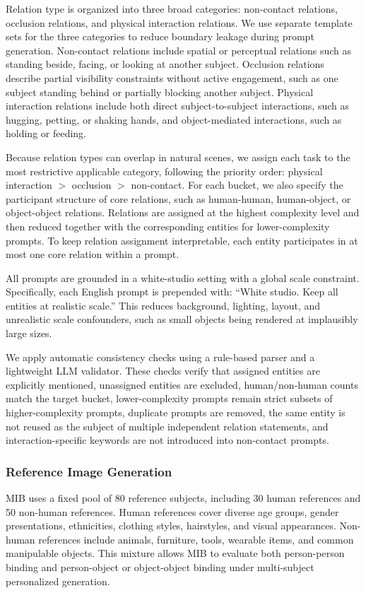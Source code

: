 \documentclass{article}
\begin{document}
Relation type is organized into three broad categories: non-contact relations, occlusion relations, and physical interaction relations. We use separate template sets for the three categories to reduce boundary leakage during prompt generation. Non-contact relations include spatial or perceptual relations such as standing beside, facing, or looking at another subject. Occlusion relations describe partial visibility constraints without active engagement, such as one subject standing behind or partially blocking another subject. Physical interaction relations include both direct subject-to-subject interactions, such as hugging, petting, or shaking hands, and object-mediated interactions, such as holding or feeding.

Because relation types can overlap in natural scenes, we assign each task to the most restrictive applicable category, following the priority order: physical interaction $>$ occlusion $>$ non-contact. For each bucket, we also specify the participant structure of core relations, such as human-human, human-object, or object-object relations. Relations are assigned at the highest complexity level and then reduced together with the corresponding entities for lower-complexity prompts. To keep relation assignment interpretable, each entity participates in at most one core relation within a prompt.

All prompts are grounded in a white-studio setting with a global scale constraint. Specifically, each English prompt is prepended with: ``White studio. Keep all entities at realistic scale.'' This reduces background, lighting, layout, and unrealistic scale confounders, such as small objects being rendered at implausibly large sizes.

We apply automatic consistency checks using a rule-based parser and a lightweight LLM validator. These checks verify that assigned entities are explicitly mentioned, unassigned entities are excluded, human/non-human counts match the target bucket, lower-complexity prompts remain strict subsets of higher-complexity prompts, duplicate prompts are removed, the same entity is not reused as the subject of multiple independent relation statements, and interaction-specific keywords are not introduced into non-contact prompts.

\subsubsection{Reference Image Generation}

MIB uses a fixed pool of 80 reference subjects, including 30 human references and 50 non-human references. Human references cover diverse age groups, gender presentations, ethnicities, clothing styles, hairstyles, and visual appearances. Non-human references include animals, furniture, tools, wearable items, and common manipulable objects. This mixture allows MIB to evaluate both person-person binding and person-object or object-object binding under multi-subject personalized generation.
\end{document}
